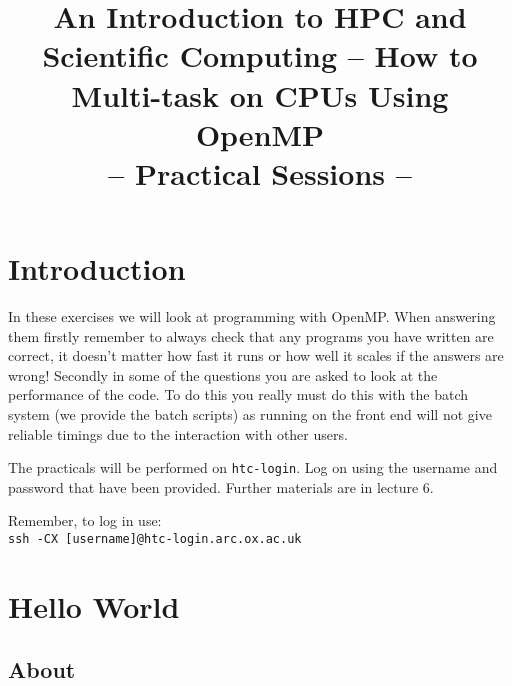\documentclass[a4paper, 12pt]{article}
\title{{\Huge\bf An Introduction to HPC and Scientific Computing -- How to Multi-task on CPUs Using OpenMP\footnotetext{Thanks to Ian Bush for materials.}} \\ {\huge -- Practical Sessions --}}
\date{}
\def \cc   {\tt }               %
\begin{document}
\maketitle

\vfill

\tableofcontents

\newpage


\section{Introduction}
\label{Introduction}

In these exercises we will look at programming with OpenMP. When answering them firstly
remember to always check that any programs you have written are correct, it doesn't matter
how fast it runs or how well it scales if the answers are wrong! Secondly in some of the
questions you are asked to look at the performance of the code. To do this you really
must do this with the batch system (we provide the batch scripts) as running on the front
end will not give reliable timings due to the interaction with other users.

The practicals will be performed on {\cc htc-login}. Log on using the username and password that have been provided. Further materials are in lecture 6.

Remember, to log in use: \\
{\cc ssh -CX [username]@htc-login.arc.ox.ac.uk}


\section{Hello World}
\label{basics}

\subsection*{About}
\end{document}

